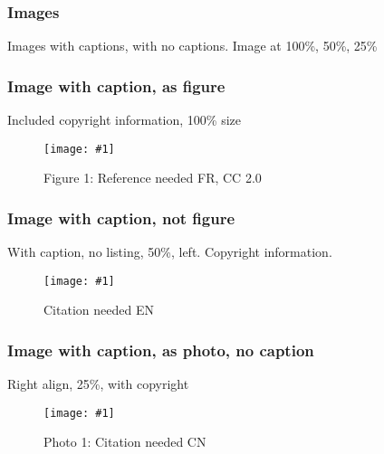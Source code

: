 \documentclass{article}
\newlength{\imgwidth}
\newcommand\scaledgraphics[2]{%
                
\settowidth{\imgwidth}{\texttt{[image: \#1]}}%
                
\setlength{\imgwidth}{\minof{\imgwidth}{#2\textwidth}}%
                
\texttt{[image: \#1]}%
                
}
\begin{document}
\subsubsection{Images}\label{H607067}



Images with captions, with no captions. Image at 100\%, 50\%, 25\%


\subsubsection{Image with caption, as figure}\label{H415836}



Included copyright information, 100\% size

\begin{figure}
\scaledgraphics{6fcd536f-7b25-4706-ba4e-aef280055634.jpg}{1}
\caption*{Figure 1: Reference needed FR, CC 2.0}\label{F46521}
\end{figure}





\subsubsection{Image with caption, not figure}\label{H9577977}



With caption, no listing, 50\%, left. Copyright information.

\begin{wrapfigure}{l}{0.5\textwidth}
\scaledgraphics{63e9e3b9-9635-4931-b968-b27c31dfebe1.jpg}{0.5}
\caption*{Citation needed EN}\label{F35988861}
\end{wrapfigure}

















\subsubsection{Image with caption, as photo, no caption}\label{H166321}



Right align, 25\%, with copyright

\begin{wrapfigure}{r}{0.25\textwidth}
\scaledgraphics{c257c489-b841-4e89-aa1f-5f0fd3ddee69.png}{0.25}
\caption*{Photo 1: Citation needed CN}\label{F40137711}
\end{wrapfigure}
\end{document}
